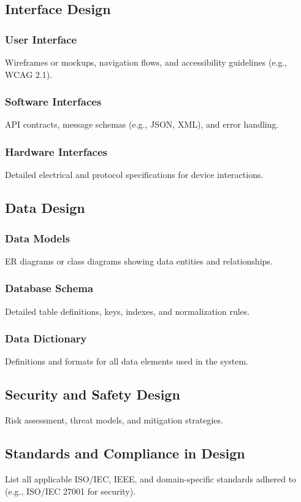 \documentclass[12pt,a4paper]{report}
\begin{document}
\subsection{Interface Design}
\subsubsection{User Interface}
Wireframes or mockups, navigation flows, and accessibility guidelines (e.g., WCAG 2.1).

\subsubsection{Software Interfaces}
API contracts, message schemas (e.g., JSON, XML), and error handling.

\subsubsection{Hardware Interfaces}
Detailed electrical and protocol specifications for device interactions.

\subsection{Data Design}
\subsubsection{Data Models}
ER diagrams or class diagrams showing data entities and relationships.

\subsubsection{Database Schema}
Detailed table definitions, keys, indexes, and normalization rules.

\subsubsection{Data Dictionary}
Definitions and formats for all data elements used in the system.

\subsection{Security and Safety Design}
Risk assessment, threat models, and mitigation strategies.

\subsection{Standards and Compliance in Design}
List all applicable ISO/IEC, IEEE, and domain-specific standards adhered to (e.g., ISO/IEC 27001 for security).
\end{document}
